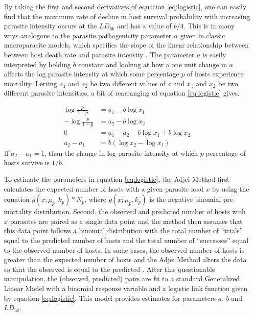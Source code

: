 \documentclass[12pt, a4paper]{article}
\begin{document}
By taking the first and second derivatives of equation \ref{eq:logistic}, one can easily find that the maximum rate of decline in host survival probability with increasing parasite intensity occurs at the $LD_{50}$ and has a value of $b / 4$.  This is in many ways analogous to the parasite pathogenicity parameter $\alpha$ given in classic macroparasite models, which specifies the slope of the linear relationship between between host death rate and parasite intensity \citep{AndersonandMay1978, Isham1995}.  The parameter $a$ is easily interpreted by holding $b$ constant and looking at how a one unit change in $a$ affects the log parasite intensity at which some percentage $p$ of hosts experience mortality.  Letting $a_1$ and $a_2$ be two different values of $a$ and $x_1$ and $x_2$ be two different parasite intensities, a bit of rearranging of equation \ref{eq:logistic} gives.

\begin{align*}
    \log{\frac{p}{1 - p}} &= a_1 - b \log{x_1}\\
    - \log{\frac{p}{1 - p}} &= a_2 - b \log{x_2}\\
    0 &= a_1 - a_2 - b\log{x_1} + b\log{x_2}\\
    a_2 - a_1 &= b(\log{x_2} - \log{x_1})
\end{align*}
If $a_2 - a_1 = 1$, than the change in log parasite intensity at which $p$ percentage of hosts survive is $1 / b$.

To estimate the parameters in equation \ref{eq:logistic}, the Adjei Method first
calculates the expected number of hosts with a given parasite load $x$ by using
the equation $g(x ; \mu_p, k_p) * N_p$, where $g(x ; \mu_p, k_p)$ is the negative binomial pre-mortality distribution.  Second, the observed and predicted number of hosts
with $x$ parasites are paired as a single data point and the method then assumes that
this data point follows a binomial distribution with the total number of
``trials'' equal to the predicted number of hosts and the total number of
``successes'' equal to the observed number of hosts. In some cases, the
observed number of hosts is greater than the expected number of hosts and the
Adjei Method alters the data so that the observed is equal to the predicted
\citep{Adjei1986}.  After this questionable manipulation, the (observed, predicted) pairs are fit to a standard Generalized Linear Model \citep{McCullagh1989} with a binomial response variable and a logistic link function given by equation \ref{eq:logistic}.  This model provides estimates for parameters $a$, $b$ and $LD_{50}$.
\end{document}
